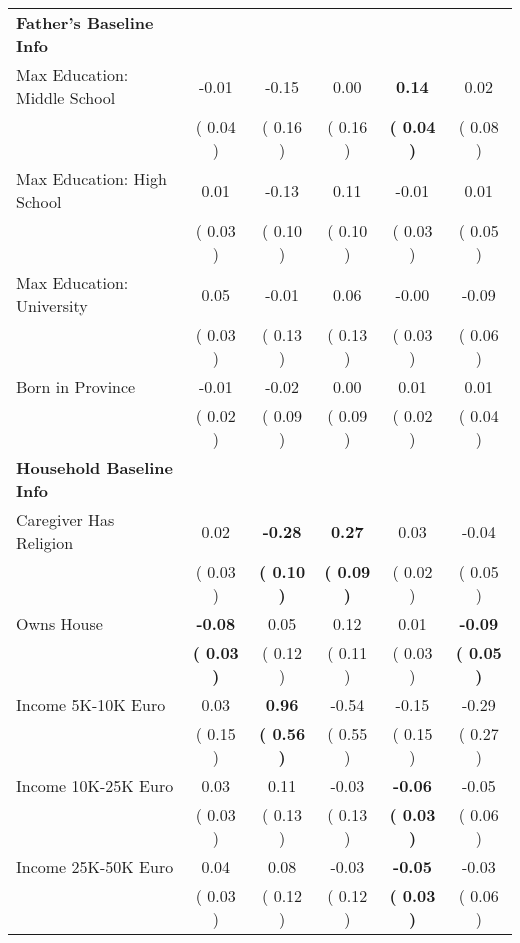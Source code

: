 \begin{table}[H]
{\begin{tabular}{lccccc}
\midrule
\textbf{Father's Baseline Info} \\
\quad Max Education: Middle School &     -0.01 &     -0.15 &      0.00 & \textbf{     0.14} &      0.02 \\
\quad  & (     0.04 ) & (     0.16 )  & (     0.16 )  & \textbf{(     0.04 )} & (     0.08 ) \\
\quad Max Education: High School &      0.01 &     -0.13 &      0.11 &     -0.01 &      0.01 \\
\quad  & (     0.03 ) & (     0.10 )  & (     0.10 )  & (     0.03 ) & (     0.05 ) \\
\quad Max Education: University &      0.05 &     -0.01 &      0.06 &     -0.00 &     -0.09 \\
\quad  & (     0.03 ) & (     0.13 )  & (     0.13 )  & (     0.03 ) & (     0.06 ) \\
\quad Born in Province &     -0.01 &     -0.02 &      0.00 &      0.01 &      0.01 \\
\quad  & (     0.02 ) & (     0.09 )  & (     0.09 )  & (     0.02 ) & (     0.04 ) \\
\midrule
\textbf{Household Baseline Info} \\
\quad Caregiver Has Religion &      0.02 & \textbf{    -0.28} & \textbf{     0.27} &      0.03 &     -0.04 \\
\quad  & (     0.03 ) & \textbf{(     0.10 )}  & \textbf{(     0.09 )}  & (     0.02 ) & (     0.05 ) \\
\quad Owns House & \textbf{    -0.08} &      0.05 &      0.12 &      0.01 & \textbf{    -0.09} \\
\quad  & \textbf{(     0.03 )} & (     0.12 )  & (     0.11 )  & (     0.03 ) & \textbf{(     0.05 )} \\
\quad Income 5K-10K Euro &      0.03 & \textbf{     0.96} &     -0.54 &     -0.15 &     -0.29 \\
\quad  & (     0.15 ) & \textbf{(     0.56 )}  & (     0.55 )  & (     0.15 ) & (     0.27 ) \\
\quad Income 10K-25K Euro &      0.03 &      0.11 &     -0.03 & \textbf{    -0.06} &     -0.05 \\
\quad  & (     0.03 ) & (     0.13 )  & (     0.13 )  & \textbf{(     0.03 )} & (     0.06 ) \\
\quad Income 25K-50K Euro &      0.04 &      0.08 &     -0.03 & \textbf{    -0.05} &     -0.03 \\
\quad  & (     0.03 ) & (     0.12 )  & (     0.12 )  & \textbf{(     0.03 )} & (     0.06 ) \\

\end{tabular}}
\end{table}
